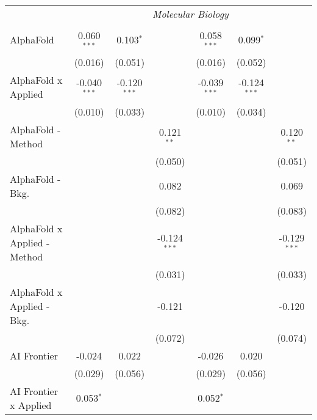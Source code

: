 \begin{tabular}{lcccccc}
 & \multicolumn{6}{c}{\textit{Molecular Biology}} \\ \\
   AlphaFold                    & 0.060$^{***}$  & 0.103$^{*}$    &                & 0.058$^{***}$  & 0.099$^{*}$    &   \\   
                                & (0.016)        & (0.051)        &                & (0.016)        & (0.052)        &   \\   
   AlphaFold x Applied          & -0.040$^{***}$ & -0.120$^{***}$ &                & -0.039$^{***}$ & -0.124$^{***}$ &   \\   
                                & (0.010)        & (0.033)        &                & (0.010)        & (0.034)        &   \\   
   AlphaFold - Method           &                &                & 0.121$^{**}$   &                &                & 0.120$^{**}$\\   
                                &                &                & (0.050)        &                &                & (0.051)\\   
   AlphaFold - Bkg.             &                &                & 0.082          &                &                & 0.069\\   
                                &                &                & (0.082)        &                &                & (0.083)\\   
   AlphaFold x Applied - Method &                &                & -0.124$^{***}$ &                &                & -0.129$^{***}$\\   
                                &                &                & (0.031)        &                &                & (0.033)\\   
   AlphaFold x Applied - Bkg.   &                &                & -0.121         &                &                & -0.120\\   
                                &                &                & (0.072)        &                &                & (0.074)\\   
   AI Frontier                  & -0.024         & 0.022          &                & -0.026         & 0.020          &   \\   
                                & (0.029)        & (0.056)        &                & (0.029)        & (0.056)        &   \\   
   AI Frontier x Applied        & 0.053$^{*}$    &                &                & 0.052$^{*}$    &                &   \\   

\end{tabular}
